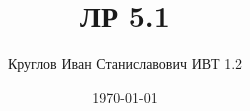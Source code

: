 \documentclass[12pt, a4paper]{article}
\author{Круглов Иван Станиславович ИВТ 1.2}
\title{ЛР 5.1}
\date{\today}
\begin{document}
    \maketitle
    
    \begin{table}[h!]
        \centering
        \setlength{\extrarowheight}{1.5pt}
        \begin{longtable}{|c|c|c|M{4cm}|M{2.5cm}|N}
            \hline
            
            \hline
        \end{longtable}
    \end{table}

    \XeLaTeX
\end{document}
